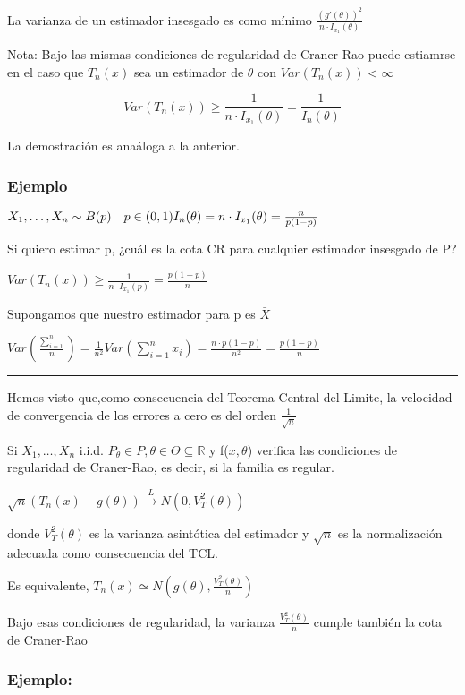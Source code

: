 La varianza de un estimador insesgado es como mínimo $\frac{(g'(\theta))^2}{n \cdot I_{x_1}(\theta)}$

Nota: Bajo las mismas condiciones de regularidad de Craner-Rao puede estiamrse
en el caso que $T_n(x)$ sea un estimador de $\theta$ con $Var(T_n(x))<\infty$

\[
Var(T_n(x)) \geq \frac{1}{n \cdot I_{x_1}(\theta)}= \frac{1}{I_n(\theta)}
\]


La demostración es anaáloga a la anterior.

\subsubsection*{Ejemplo}


\(
X_1,\dots,X_n \sim B(p) \quad p \in (0,1)
\\I_n(\theta)=n \cdot I_{x_1}(\theta)=\frac{n}{p(1-p)}
\)

Si quiero estimar p, ¿cuál es la cota CR para cualquier estimador insesgado de P?

\(
Var(T_n(x)) \geq \frac{1}{n \cdot I_{x_1}(p)}=\frac{p(1-p)}{n}
\)

Supongamos que nuestro estimador para p es $\bar{X}$

$Var(\frac{\sum_{i=1}^{n}}{n})=\frac{1}{n^2}Var(\sum_{i=1}^{n} x_i)
=\frac{n \cdot p(1-p)}{n^2}=\frac{p(1-p)}{n}$

\noindent\rule{\textwidth}{0.5pt} %

Hemos visto que,como consecuencia del Teorema Central del Limite,  la velocidad de convergencia de los errores a cero es del orden $\frac{1}{\sqrt{n}}$

Si $X_1,\dots,X_n$ i.i.d. $P_\theta \in P,\theta \in \Theta \subseteq \mathbb{R}$ y f($x,\theta$)
verifica las condiciones de regularidad de Craner-Rao, es decir, si la familia es regular.

$\sqrt{n}(T_n(x)-g(\theta)) \xrightarrow{L} N(0,V_T^2(\theta))$

donde $V_T^2(\theta)$ es la varianza asintótica del estimador y $\sqrt{n}$ es la normalización
adecuada como consecuencia del TCL.

Es equivalente, $T_n(x) \simeq N(g(\theta),\frac{V_T^2(\theta)}{n})$

Bajo esas condiciones de regularidad, la varianza $\frac{V_T^2(\theta)}{n}$
cumple también la cota de Craner-Rao

\subsubsection*{Ejemplo:}


